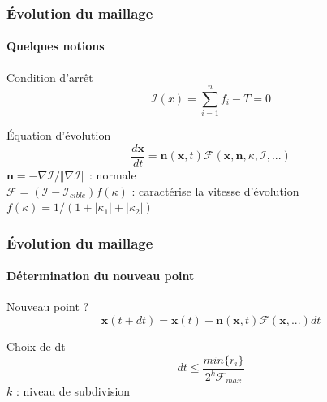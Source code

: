 \documentclass[9pt]{beamer}
\begin{document}
\begin{frame}
	\frametitle{Évolution du maillage}
	\framesubtitle{Quelques notions}
	
	\begin{block}{Condition d'arrêt}
		\begin{equation*}
			\mathcal{I}(x) = \sum_{i=1}^{n} f_i - T = 0
		\end{equation*}
	\end{block}
	
	\begin{block}{Équation d'évolution}
		\begin{equation*}
			\frac{d\textbf{x}}{dt} = \textbf{n}(\textbf{x}, t) \mathcal{F}(\textbf{x}, \textbf{n}, \kappa, \mathcal{I}, ...)		
		\end{equation*}
		$\textbf{n} = -\nabla\mathcal{I} / \Vert\nabla\mathcal{I}\Vert$ : normale \\
		$\mathcal{F} = ( \mathcal{I} - \mathcal{I}_{cible} ) f(\kappa)$ : caractérise la vitesse d'évolution \\
		$f(\kappa) = 1 / (1 + |\kappa_1| + |\kappa_2|)$
	\end{block}
\end{frame}

\begin{frame}
	\frametitle{Évolution du maillage}
	\framesubtitle{Détermination du nouveau point}
	
	\begin{block}{Nouveau point ?}
		\begin{equation*}
			\textbf{x}(t + dt) = \textbf{x}(t) + \textbf{n}(\textbf{x}, t) \mathcal{F}(\textbf{x}, ...) dt
		\end{equation*}
	\end{block}
	
	\begin{block}{Choix de dt}
		\begin{equation*}
			dt \le \frac{min\{r_i\}}{2^k \mathcal{F}_{max}}
		\end{equation*}
		$k$ : niveau de subdivision
	\end{block}
\end{frame}
\end{document}
